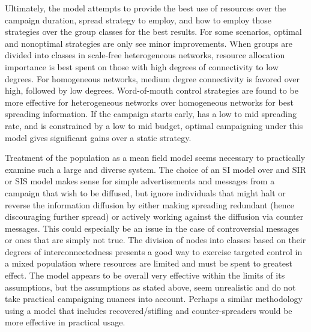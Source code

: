 Ultimately, the model attempts to provide the best use of resources over the campaign duration, spread strategy to employ, and how to employ those strategies over the group classes for the best results. For some scenarios, optimal and nonoptimal strategies are only see minor improvements. When groups are divided into classes in scale-free heterogeneous networks, resource allocation importance is best spent on those with high degrees of connectivity to low degrees. For homogeneous networks, medium degree connectivity is favored over high, followed by low degrees. Word-of-mouth control strategies are found to be more effective for heterogeneous networks over homogeneous networks for best spreading information. If the campaign starts early, has a low to mid spreading rate, and is constrained by a low to mid budget, optimal campaigning under this model gives significant gains over a static strategy. \cite{kandhway2016campaigning}

Treatment of the population as a mean field model seems necessary to practically examine such a large and diverse system. The choice of an SI model over and SIR or SIS model makes sense for simple advertisements and messages from a campaign that wish to be diffused, but ignore individuals that might halt or reverse the information diffusion by either making spreading redundant (hence discouraging further spread) or actively working against the diffusion via counter messages. This could especially be an issue in the case of controversial messages or ones that are simply not true. The division of nodes into classes based on their degrees of interconnectedness presents a good way to exercise targeted control in a mixed population where resources are limited and must be spent to greatest effect. The model appears to be overall very effective within the limits of its assumptions, but the assumptions as stated above, seem unrealistic and do not take practical campaigning nuances into account. Perhaps a similar methodology using a model that includes recovered/stifling and counter-spreaders would be more effective in practical usage.